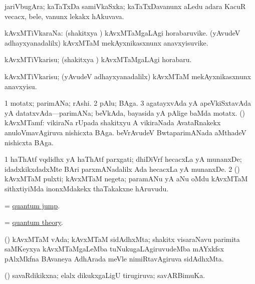 \bentry
{}
\gl{\nA}
\bmng
jariVbugAra; kaTaTxDa samiVkaSxka; kaTaTxDavanunx aLedu adara KacuR vecacx, bele, \mo vanunx lekakx hAkuvava. 
\emng
\eentry

\bentry
{}
\gl{\nA}
\bmng
kAvxMTiVkaraNa: 
\banum
{} (shakitxya \vi) kAvxMTaMgaLAgi horabaruvike. 
 (yAvudeV adhayxyanadalilx) kAvxMTaM mekAyxnikasxnunx anavxyisuvike. 
\eanum
\emng
\eentry

\bentry
{}
\gl{\akirx}
\bmng
kAvxMTiVkarisu; (shakitxya \vi) kAvxMTaMgaLAgi horabaru. 
\emng

\noindent
\gl{\sakirx}
\bmng
kAvxMTiVkarisu; (yAvudeV adhayxyanadalilx) kAvxMTaM mekAyxnikasxnunx anavxyisu. 
\emng
\eentry

\bentry
{}
\gl{\nA}
\bmng
\bnum
\num{1} motatx; parimANa; rAshi. 
\num{2} pAlu; BAga. 
\num{3} agatayxvAda yA apeVkiSxtavAda yA datatxvAda---parimANa; beVkAda, bayasida yA pAlige baMda motatx. 
 (\Bwvi) kAvxMTamf: 
\banum
{} vikiraNa rUpada shakitxyu A vikiraNada AvataRnakekx anuloVmavAgiruva nishicxta BAga. 
 beVrAvudeV BwtaparimANada aMthadeV nishicxta BAga. 
\eanum
\numie
\enum
\emng
\eentry

\bentry
{}
\gl{\nA}
\bmng
\bnum
\num{1} haThAtf vqdidhx yA haThAtf parxgati; dhiDiVrf hecacxLa yA munanxDe; idadxkikxdadxMte BAri parxmANadalilx Ada hecacxLa yA munanxDe. 
\num{2} (\Bwvi) kAvxMTaM pulxti; kAvxMTaM negeta; paramANu yA aNu oMdu kAvxMTaM sithxtiyiMda inonxMdakekx thaTakakxne hAruvudu. 
\enum
\emng
\eentry

\bentry
{}
\gl{\nA}
\bmng
= \hyperlink{quantum jump}{quantum jump}. 
\emng
\eentry

\bentry
{}
\gl{\nA}
\bmng
= \hyperlink{quantum theory}{quantum theory}. 
\emng
\eentry

\bentry
{}
\gl{\nA}
\bmng
(\Bwvi) kAvxMTaM vAda; kAvxMTaM sidAdhxMta; shakitx visaraNavu parimita saMKeyxya kAvxMTaMgaLeMba tuNukugaLAgiruvudeMba mAYxkfsx pAlxMkfna BAvaneya AdhArada meVle nimiRtavAgiruva sidAdhxMta. 
\emng
\eentry

\bentry
{}
\gl{\gu}
\bmng
(\BUvi) savaRdikikxna; elalx dikukxgaLigU tirugiruva; savARBimuKa. 
\emng
\eentry

